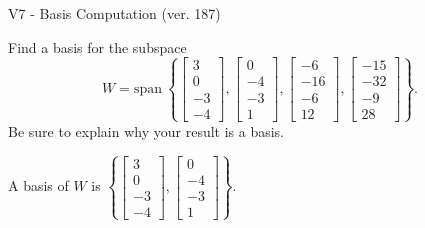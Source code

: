 \begin{exercise}
  \begin{exerciseTitle}V7 - Basis Computation (ver. 187)\end{exerciseTitle}
  \begin{exerciseStatement}
    Find a basis for the subspace 
\[W=\mathrm{span}\ \left\{\left[\begin{array}{r}
3 \\
0 \\
-3 \\
-4
\end{array}\right] , \left[\begin{array}{r}
0 \\
-4 \\
-3 \\
1
\end{array}\right] , \left[\begin{array}{r}
-6 \\
-16 \\
-6 \\
12
\end{array}\right] , \left[\begin{array}{r}
-15 \\
-32 \\
-9 \\
28
\end{array}\right]\right\}.\]
 Be sure to explain why your result is a basis.


  \end{exerciseStatement}
  \begin{exerciseAnswer}
   A basis of \(W\) is  \(\left\{\left[\begin{array}{r}
3 \\
0 \\
-3 \\
-4
\end{array}\right] , \left[\begin{array}{r}
0 \\
-4 \\
-3 \\
1
\end{array}\right]\right\}\).
  


  \end{exerciseAnswer}
\end{exercise}